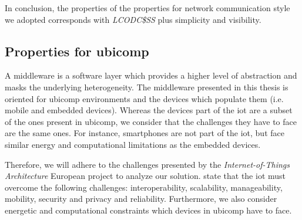 In conclusion, the properties of the properties for network communication style we adopted corresponds with \emph{LCODC\$SS} plus simplicity and visibility. %







\subsection{Properties for \acs{ubicomp}}
\label{sec:middleware_properties}

A middleware is a software layer which provides a higher level of abstraction and masks the underlying heterogeneity.
The middleware presented in this thesis is oriented for \ac{ubicomp} environments and the devices which populate them (i.e. mobile and embedded devices).
Whereas the devices part of the \ac{iot} are a subset of the ones present in \ac{ubicomp}, we consider that the challenges they have to face are the same ones.
For instance, smartphones are not part of the \ac{iot}, but face similar energy and computational limitations as the embedded devices. %

Therefore, we will adhere to the challenges presented by the \emph{Internet-of-Things Architecture} European project \citep{walewski_project_2011} to analyze our solution.
\citeauthor{walewski_project_2011} state that the \ac{iot} must overcome the following challenges:
interoperability, scalability, manageability, mobility, security and privacy and reliability.
Furthermore, we also consider energetic and computational constraints which devices in \ac{ubicomp} have to face. %


